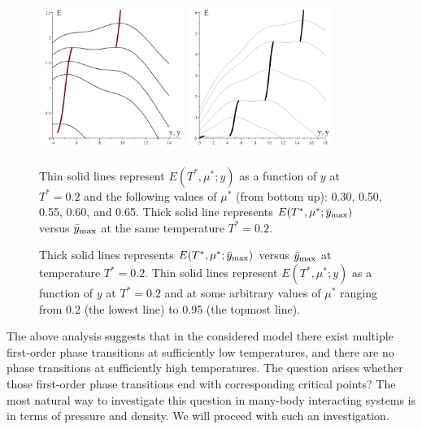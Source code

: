 \documentclass[12pt]{article}
\numberwithin{equation}{section}
\begin{document}
	\begin{figure}[htbp]
		\includegraphics[width=0.42\textwidth,angle=0]{images/EvsYvs_barY_b3}
		\hfill
		\includegraphics[width=0.42\textwidth,angle=0]{images/EvsYvs_barY_b4}
		\vfill
		\parbox{0.45\textwidth}{\caption{\label{fig:EvsYvs_barY_b3} Thin solid lines represent $E(T^*,\mu^*;y)$ as a function of $y$ at $T^*=0.2$ and the following values of $\mu^*$ (from bottom up): 0.30, 0.50, 0.55, 0.60, and 0.65. Thick solid line represents $E(T^*,\mu^*;\bar{y}_{\rm max})$ versus $\bar{y}_{\rm max}$ at the same temperature $T^* = 0.2$.}}
		\hfill
		\parbox{0.45\textwidth}{\caption{\label{fig:EvsYvs_barY_b4} Thick solid lines represents $E(T^*,\mu^*;\bar{y}_{\rm max})$ versus $\bar{y}_{\rm max}$ at temperature $T^* = 0.2$. Thin solid lines represent $E(T^*,\mu^*;y)$ as a function of $y$ at $T^*=0.2$ and at some arbitrary values of $\mu^*$ ranging from 0.2 (the lowest line) to 0.95 (the topmost line).}}
		
	\end{figure}
	
	The above analysis suggests that in the considered model there exist multiple first-order phase transitions at sufficiently low temperatures, and there are no phase transitions at sufficiently high temperatures. The question arises whether those first-order phase transitions end with corresponding critical points? The most natural way to investigate this question in many-body interacting systems is in terms of pressure and density. We will proceed with such an investigation.
	
\end{document}
